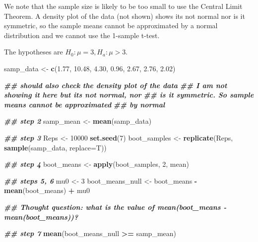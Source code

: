 \documentclass[
]{book}
\newenvironment{Shaded}{\begin{snugshade}}{\end{snugshade}}
\newcommand{\AttributeTok}[1]{\textcolor[rgb]{0.13,0.29,0.53}{#1}}
\newcommand{\DecValTok}[1]{\textcolor[rgb]{0.00,0.00,0.81}{#1}}
\newcommand{\DocumentationTok}[1]{\textcolor[rgb]{0.56,0.35,0.01}{\textbf{\textit{#1}}}}
\newcommand{\FloatTok}[1]{\textcolor[rgb]{0.00,0.00,0.81}{#1}}
\newcommand{\FunctionTok}[1]{\textcolor[rgb]{0.13,0.29,0.53}{\textbf{#1}}}
\newcommand{\NormalTok}[1]{#1}
\newcommand{\OtherTok}[1]{\textcolor[rgb]{0.56,0.35,0.01}{#1}}
\newcommand{\SpecialCharTok}[1]{\textcolor[rgb]{0.81,0.36,0.00}{\textbf{#1}}}
\theoremstyle{definition}
\theoremstyle{definition}
\theoremstyle{definition}
\theoremstyle{definition}
\theoremstyle{remark}
\begin{document}
We note that the sample size is likely to be too small to use the Central Limit Theorem. A density plot of the data (not shown) shows its not normal nor is it symmetric, so the sample means cannot be approximated by a normal distribution and we cannot use the 1-sample t-test.

The hypotheses are \(H_0: \mu = 3, H_a: \mu > 3\).

\begin{Shaded}
\begin{Highlighting}[]
\NormalTok{samp\_data }\OtherTok{\textless{}{-}} \FunctionTok{c}\NormalTok{(}\FloatTok{1.77}\NormalTok{, }\FloatTok{10.48}\NormalTok{, }\FloatTok{4.30}\NormalTok{, }\FloatTok{0.96}\NormalTok{, }\FloatTok{2.67}\NormalTok{, }\FloatTok{2.76}\NormalTok{, }\FloatTok{2.02}\NormalTok{)}

\DocumentationTok{\#\# should also check the density plot of the data}
\DocumentationTok{\#\# I am not showing it here but its not normal, nor}
\DocumentationTok{\#\# is it symmetric. So sample means cannot be approximated}
\DocumentationTok{\#\# by normal}

\DocumentationTok{\#\# step 2}
\NormalTok{samp\_mean }\OtherTok{\textless{}{-}} \FunctionTok{mean}\NormalTok{(samp\_data)}

\DocumentationTok{\#\# step 3}
\NormalTok{Reps }\OtherTok{\textless{}{-}} \DecValTok{10000}
\FunctionTok{set.seed}\NormalTok{(}\DecValTok{7}\NormalTok{)}
\NormalTok{boot\_samples }\OtherTok{\textless{}{-}} \FunctionTok{replicate}\NormalTok{(Reps, }\FunctionTok{sample}\NormalTok{(samp\_data, }\AttributeTok{replace=}\NormalTok{T))}

\DocumentationTok{\#\# step 4}
\NormalTok{boot\_means }\OtherTok{\textless{}{-}} \FunctionTok{apply}\NormalTok{(boot\_samples, }\DecValTok{2}\NormalTok{, mean)}

\DocumentationTok{\#\# steps 5, 6}
\NormalTok{mu0 }\OtherTok{\textless{}{-}} \DecValTok{3}
\NormalTok{boot\_means\_null }\OtherTok{\textless{}{-}}\NormalTok{ boot\_means }\SpecialCharTok{{-}} \FunctionTok{mean}\NormalTok{(boot\_means) }\SpecialCharTok{+}\NormalTok{ mu0}

\DocumentationTok{\#\# Thought question: what is the value of mean(boot\_means {-} mean(boot\_means))?}

\DocumentationTok{\#\# step 7}
\FunctionTok{mean}\NormalTok{(boot\_means\_null }\SpecialCharTok{\textgreater{}=}\NormalTok{ samp\_mean)}
\end{Highlighting}
\end{Shaded}
\end{document}
